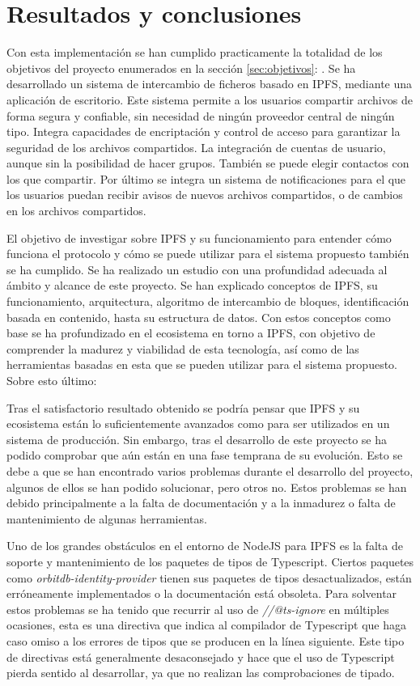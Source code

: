 \chapter{Resultados y conclusiones}\label{chap:6resultados}

Con esta implementación se han cumplido practicamente la totalidad de los objetivos del proyecto enumerados en la sección \ref{sec:objetivos}: . Se ha desarrollado un sistema de intercambio de ficheros basado en IPFS, mediante una aplicación de escritorio. Este sistema permite a los usuarios compartir archivos de forma segura y confiable, sin necesidad de ningún proveedor central de ningún tipo. Integra capacidades de encriptación y control de acceso para garantizar la seguridad de los archivos compartidos. La integración de cuentas de usuario, aunque sin la posibilidad de hacer grupos. También se puede elegir contactos con los que compartir. Por último se integra un sistema de notificaciones para el que
los usuarios puedan recibir avisos de nuevos archivos compartidos, o de cambios en los archivos compartidos.

El objetivo de investigar sobre IPFS y su funcionamiento para entender cómo funciona el protocolo y cómo se puede utilizar para el sistema propuesto también se ha cumplido. Se ha realizado un estudio con una profundidad adecuada al ámbito y alcance de este proyecto. Se han explicado conceptos de IPFS, su funcionamiento, arquitectura, algoritmo de intercambio de bloques, identificación basada en contenido, hasta su estructura de datos.
Con estos conceptos como base se ha profundizado en el ecosistema en torno a IPFS, con objetivo de comprender la madurez y viabilidad de esta tecnología, así como de las herramientas basadas en esta que se pueden utilizar para el sistema propuesto. Sobre esto último:

Tras el satisfactorio resultado obtenido se podría pensar que IPFS y su ecosistema están lo suficientemente avanzados como para ser utilizados en un sistema de producción. Sin embargo, tras el desarrollo de este proyecto se ha podido comprobar que aún están en una fase temprana de su evolución. Esto se debe a que se han encontrado varios problemas durante el desarrollo del proyecto, algunos de ellos se han podido solucionar, pero otros no. Estos problemas se han debido principalmente a la falta de documentación y a la inmadurez o falta de mantenimiento de algunas herramientas.

Uno de los grandes obstáculos en el entorno de NodeJS para IPFS es la falta de soporte y mantenimiento de los paquetes de tipos de Typescript.
Ciertos paquetes como \textit{orbitdb-identity-provider} tienen sus paquetes de tipos desactualizados, están erróneamente implementados o la documentación está obsoleta. Para solventar estos problemas se ha tenido que recurrir al uso de \textit{//@ts-ignore} en múltiples ocasiones, esta
es una directiva que indica al compilador de Typescript que haga caso omiso a los errores de tipos que se producen en la línea siguiente. Este tipo de directivas está
generalmente desaconsejado y hace que el uso de Typescript pierda sentido al desarrollar, ya que no realizan las comprobaciones de tipado.

